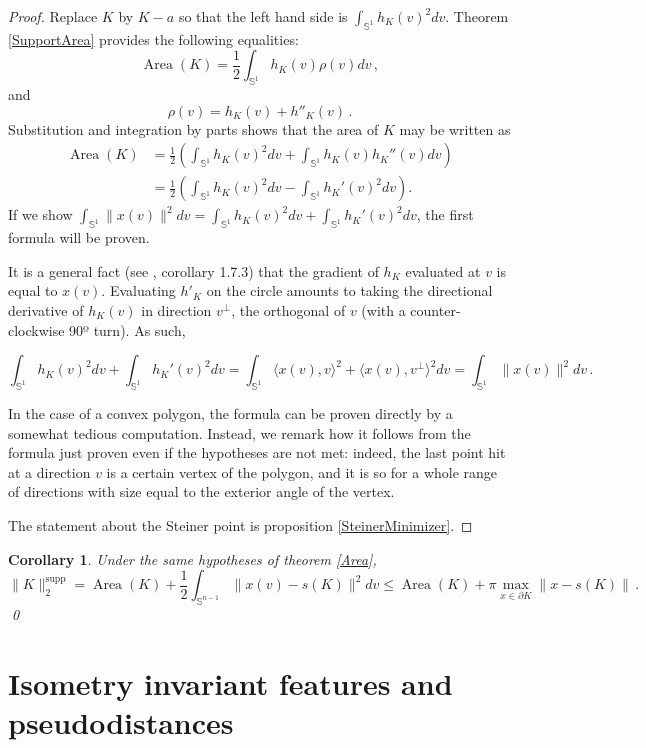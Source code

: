 \documentclass[a4paper]{article}
\newtheorem{coro}[theorem]{Corollary}
\newcommand{\bb}{\mathbb}
\newcommand{\normsupp}[1]{\|#1\|^{\operatorname{supp}}}
\begin{document}
\begin{proof}
	Replace $K$ by $K-a$ so that the left hand side is $\int_{\bb S^{1}} h_K(v)^2 dv$.
	Theorem \ref{SupportArea} provides the following equalities:
	\[ \operatorname{Area}(K)=\frac{1}{2} \int_{\bb S^{1}} h_K(v) \rho(v) dv\, ,\]
	and
	\[ \rho(v)=h_K(v)+h''_K(v)\, .\]
	Substitution and integration by parts shows that the area of $K$ may be written as
	\begin{align*}
		\operatorname{Area}(K)&=\frac{1}{2}\left( \int_{\bb S^{1}} h_K(v)^2 dv +\int_{\bb S^{1}} h_K(v) h_K''(v) dv \right) \\
		&=\frac{1}{2}\left( \int_{\bb S^{1}} h_K(v)^2 dv -\int_{\bb S^{1}} h_K'(v)^2 dv \right).
	\end{align*}
	If we show $\int_{\bb S^{1}} \|x(v)\|^2 dv = \int_{\bb S^{1}} h_K(v)^2 dv +\int_{\bb S^{1}} h_K'(v)^2 dv  $, the first formula will be proven.
	
	 It is a general fact (see \cite{schneider2013convex}, corollary 1.7.3) that the gradient of $h_K$ evaluated at $v$ is equal to $x(v)$. Evaluating $h'_K$ on the circle amounts to taking the directional derivative of $h_K(v)$ in direction $v^\perp$, the orthogonal of $v$ (with a counter-clockwise 90º turn). As such,
	
	\[ \int_{\bb S^{1}} h_K(v)^2 dv +\int_{\bb S^{1}} h_K'(v)^2 dv=\int_{\bb S^{1}} \langle x(v),v \rangle^2 +\langle x(v), v^\perp \rangle^2 dv=\int_{\bb S^1} \|x(v)\|^2 dv\, .\]
	
	In the case of a convex polygon, the formula can be proven directly by a somewhat tedious computation. Instead, we remark how it follows from the formula just proven even if the hypotheses are not met: indeed, the last point hit at a direction $v$ is a certain vertex of the polygon, and it is so for a whole range of directions with size equal to the exterior angle of the vertex.
	
	The statement about the Steiner point is proposition \ref{SteinerMinimizer}.
\end{proof}

\begin{coro}
	Under the same hypotheses of theorem \ref{Area},
	\[ \normsupp {K}_2 = \operatorname{Area}(K)+\frac{1}{2}\int_{\bb S^{n-1}} \|x(v)-s(K)\|^2 dv \leq \operatorname{Area}(K) +\pi \max_{x \in \partial K} \|x-s(K)\|\, .\] \qed
\end{coro}

	


\section{Isometry invariant features and pseudodistances}
\label{SectIsometry}
\end{document}
